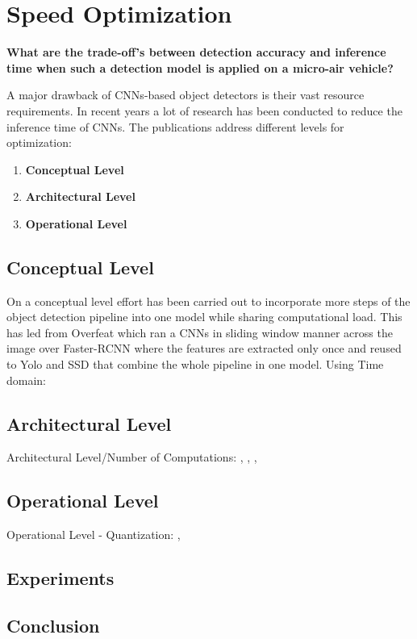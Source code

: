 \chapter{Speed Optimization}
\label{sec:tradeoff}

\begin{center}
	\textbf{What are the trade-off's between detection accuracy and inference time when such a detection model is applied on a micro-air vehicle?}
\end{center}

A major drawback of \acp{CNN}-based object detectors is their vast resource requirements. In recent years a lot of research has been conducted to reduce the inference time of \acp{CNN}. The publications address different levels for optimization:
\begin{enumerate}
	\item \textbf{Conceptual Level}
	\item \textbf{Architectural Level}
	\item \textbf{Operational Level}
\end{enumerate}

\section{Conceptual Level}
 On a conceptual level effort has been carried out to incorporate more steps of the object detection pipeline into one model while sharing computational load. This has led from Overfeat which ran a \acp{CNN} in sliding window manner across the image over Faster-RCNN where the features are extracted only once and reused to Yolo and SSD that combine the whole pipeline in one model.
 Using Time domain:
 \cite{Chen2018}
 
\section{Architectural Level}

Architectural Level/Number of Computations:
\cite{Howard2017}, \cite{Zhang2017a}, \cite{Ghosh2017}, 

\section{Operational Level}
Operational Level - Quantization:
\cite{TripathiSanDiego}, 




\section{Experiments}


\section{Conclusion}